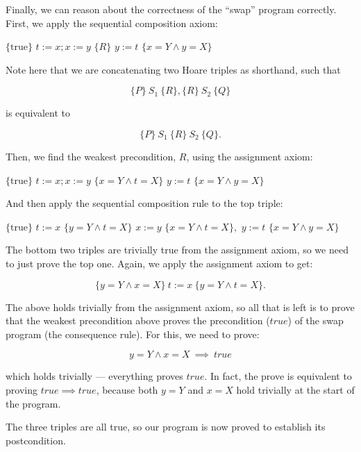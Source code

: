 \begin{example}
Finally, we can reason about the correctness of the ``swap'' program correctly.
First, we apply the sequential composition axiom:

\begin{algorithmic}[0]
\State $\{ \textrm{true} \}$
\State $t := x; x := y$
\State $\{R\}$
\State $y := t$
\State $\{x = Y\land y = X \}$
\end{algorithmic}

Note here that we are concatenating two Hoare triples as shorthand, such that 

\begin{displaymath}
\{P\} ~S_1~ \{R\},  \{R\} ~S_2~ \{Q\}
\end{displaymath}

is equivalent to 

\begin{displaymath}
\{P\} ~S_1~ \{R\} ~S_2~ \{Q\}.
\end{displaymath}

Then, we find the weakest precondition, $R$, using the assignment axiom:

\begin{algorithmic}[0]
\State $\{ \textrm{true} \}$
\State $t := x; x := y$
\State $\{x = Y\land t = X\}$
\State $y := t$
\State $\{x = Y\land y = X \}$
\end{algorithmic}


And then apply the sequential composition rule to the top triple:

\begin{algorithmic}[0]
\State $\{ \textrm{true} \}$
\State $t := x$
\State $\{ y = Y\land t = X\}$
\State $x := y$
\State $\{x = Y\land t = X\},$
\State $y := t$
\State $\{x = Y\land y = X \}$
\end{algorithmic}

The bottom two triples are trivially true from the assignment axiom, so we need to just prove the top one. Again, we apply the assignment axiom to get:

\begin{displaymath}
\{ y = Y\land x = X \}~ t := x~ \{ y = Y\land t = X\}.
\end{displaymath}

The above holds trivially from the assignment axiom, so all that is left is to prove that the weakest precondition above proves the precondition ($true$) of the swap program (the consequence rule). For this, we need to prove:

\begin{displaymath}
y = Y\land x = X ~\implies~ true
\end{displaymath}

which holds trivially --- everything proves $true$. In fact, the prove is equivalent to proving $true \implies true$, because both $y = Y$ and $x = X$ hold trivially at the start of the program.

The three triples are all true, so our program is now proved to establish its postcondition.

\end{example}

